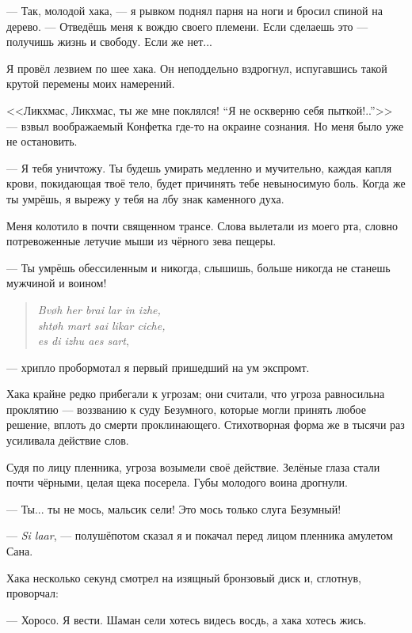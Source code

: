 --- Так, молодой хака, --- я рывком поднял парня на ноги и бросил спиной на дерево.
--- Отведёшь меня к вождю своего племени.
Если сделаешь это --- получишь жизнь и свободу.
Если же нет...

Я провёл лезвием по шее хака. Он неподдельно вздрогнул, испугавшись такой крутой перемены моих намерений.

<<Ликхмас, Ликхмас, ты же мне поклялся!
``Я не оскверню себя пыткой!..''>> --- взвыл воображаемый Конфетка где-то на окраине сознания.
Но меня было уже не остановить.

--- Я тебя уничтожу.
Ты будешь умирать медленно и мучительно, каждая капля крови, покидающая твоё тело, будет причинять тебе невыносимую боль.
Когда же ты умрёшь, я вырежу у тебя на лбу знак каменного духа.

Меня колотило в почти священном трансе.
Слова вылетали из моего рта, словно потревоженные летучие мыши из чёрного зева пещеры.

--- Ты умрёшь обессиленным и никогда, слышишь, больше никогда не станешь мужчиной и воином!

\begin{verse}
\textit{Bv\o{}h her brai lar in izhe,}\\
\textit{sht\o{}h mart sai likar ciche,}\\
\textit{es di izhu aes sart}\FM,
\end{verse}

--- хрипло пробормотал я первый пришедший на ум экспромт.

Хака крайне редко прибегали к угрозам;
они считали, что угроза равносильна проклятию --- воззванию к суду Безумного, которые могли принять любое решение, вплоть до смерти проклинающего.
Стихотворная форма же в тысячи раз усиливала действие слов.

Судя по лицу пленника, угроза возымели своё действие.
Зелёные глаза стали почти чёрными, целая щека посерела.
Губы молодого воина дрогнули.

--- Ты... ты не мось, мальсик сели!
Это мось только слуга Безумный!

--- \textit{Si laar}\FM, --- полушёпотом сказал я и покачал перед лицом пленника амулетом Сана.

Хака несколько секунд смотрел на изящный бронзовый диск и, сглотнув, проворчал:

--- Хоросо.
Я вести.
Шаман сели хотесь видесь восдь, а хака хотесь жись.

